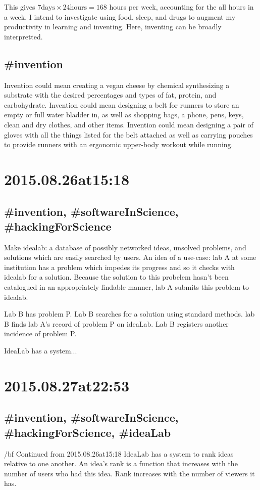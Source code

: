 This gives $7 \text{days} \times 24 \text{hours} = 168$ hours per week, accounting for the all hours in a week. I intend to investigate using food, sleep, and drugs to augment my productivity in learning and inventing. Here, inventing can be broadly interpretted.

\subsection*{#invention}
Invention could mean creating a vegan cheese by chemical synthesizing a substrate with the desired percentages and types of fat, protein, and carbohydrate. Invention could mean designing a belt for runners to store an empty or full water bladder in, as well as shopping bags, a phone, pens, keys, clean and dry clothes, and other items. Invention could mean designing a pair of gloves with all the things listed for the belt attached as well as carrying pouches to provide runners with an ergonomic upper-body workout while running.

\section*{2015.08.26at15:18}
\subsection*{#invention, #softwareInScience, #hackingForScience}
Make idealab: a database of possibly networked ideas, unsolved problems, and solutions which are easily searched by users. An idea of a use-case: lab A at some institution has a problem which impedes its progress and so it checks with idealab for a solution. Because the solution to this probelem hasn't been catalogued in an appropriately findable manner, lab A submits this problem to idealab.

Lab B has problem P. Lab B searches for a solution using standard methods. lab B finds lab A's record of problem P on ideaLab. Lab B registers another incidence of problem P.

IdeaLab has a system...

\section*{2015.08.27at22:53}
\subsection*{#invention, #softwareInScience, #hackingForScience, #ideaLab}
{/bf Continued from 2015.08.26at15:18}
IdeaLab has a system to rank ideas relative to one another. An idea's rank is a function that increases with the number of users who had this idea. Rank increases with the number of viewers it has.

